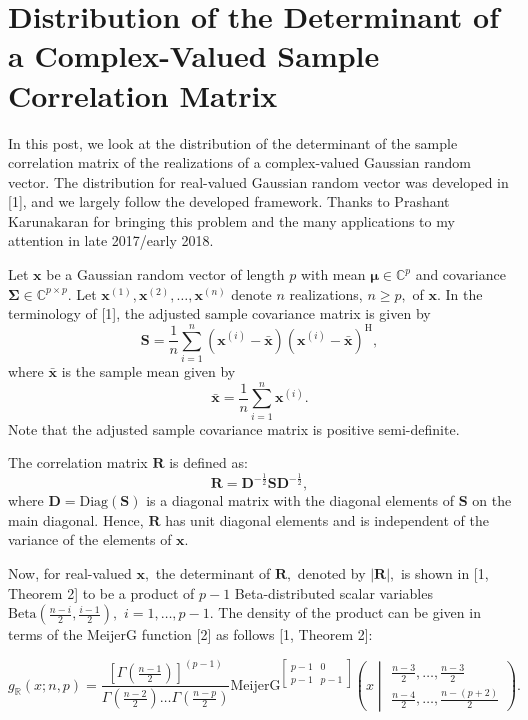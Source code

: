 \section{Distribution of the Determinant of a Complex-Valued Sample Correlation Matrix}

In this post, we look at the distribution of the determinant of the sample correlation matrix of the realizations of a complex-valued Gaussian random vector. The distribution for real-valued Gaussian random vector was developed in [1], and we largely follow the developed framework. Thanks to Prashant Karunakaran for bringing this problem and the many applications to my attention in late 2017/early 2018.

Let $\boldsymbol{x}$ be a Gaussian random vector of length $p$ with mean $\boldsymbol{\mu} \in \mathbb{C}^p$ and covariance $\boldsymbol{\Sigma} \in \mathbb{C}^{p\times p}.$ Let $\boldsymbol{x}^{(1)}, \boldsymbol{x}^{(2)}, \dots, \boldsymbol{x}^{(n)}$ denote $n$ realizations, $n \geq p,$ of $\boldsymbol{x}.$ In the terminology of [1], the adjusted sample covariance matrix is given by $$\boldsymbol{S} = \frac{1}{n}\sum_{i = 1}^{n}(\boldsymbol{x}^{(i)} - \bar{\boldsymbol{x}})(\boldsymbol{x}^{(i)} - \bar{\boldsymbol{x}})^\mathrm{H},$$ where $\bar{\boldsymbol{x}}$ is the sample mean given by $$\bar{\boldsymbol{x}} = \frac{1}{n}\sum_{i = 1}^{n}\boldsymbol{x}^{(i)}.$$ Note that the adjusted sample covariance matrix is positive semi-definite.

The correlation matrix $\boldsymbol{R}$ is defined as: $$\boldsymbol{R} = \boldsymbol{D}^{-\frac{1}{2}} \boldsymbol{S} \boldsymbol{D}^{-\frac{1}{2}},$$ where $\boldsymbol{D} = \mathrm{Diag}(\boldsymbol{S})$ is a diagonal matrix with the diagonal elements of $\boldsymbol{S}$ on the main diagonal. Hence, $\boldsymbol{R}$ has unit diagonal elements and is independent of the variance of the elements of $\boldsymbol{x}.$ 

Now, for real-valued $\boldsymbol{x},$ the determinant of $\boldsymbol{R},$ denoted by $|\boldsymbol{R}|,$ is shown in [1, Theorem 2] to be a product of $p-1$ Beta-distributed scalar variables $\mathrm{Beta}(\frac{n-i}{2},\frac{i-1}{2}),$  $i=1,\dots,p-1.$ The density of the product can be given in terms of the $\mathrm{MeijerG}$ function [2] as follows [1, Theorem 2]:

$$g_\mathbb{R}(x;n,p) = \frac{\left[\Gamma(\frac{n-1}{2})\right]^{(p-1)} }{\Gamma(\frac{n-2}{2})\dots\Gamma(\frac{n-p}{2})} \mathrm{MeijerG}^{\begin{bmatrix}p-1 & 0 \\ p-1 & p-1\end{bmatrix}}\left(x\middle|\begin{matrix}\frac{n-3}{2},\dots,\frac{n-3}{2}\\ \frac{n-4}{2},\dots,\frac{n-(p+2)}{2}\end{matrix}\right).$$

